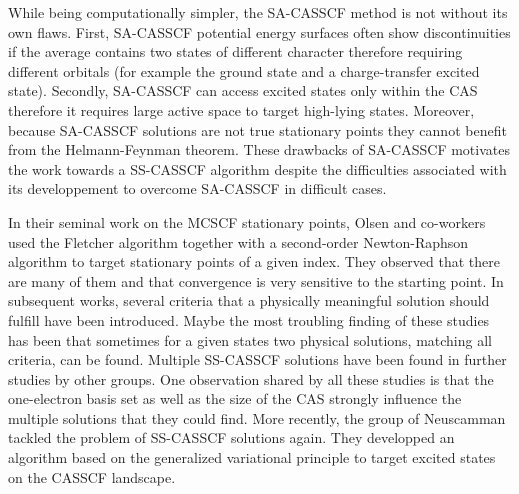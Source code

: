 \documentclass[aip,jcp,reprint,noshowkeys,superscriptaddress]{revtex4-1}
\begin{document}
While being computationally simpler, the SA-CASSCF method is not without its own flaws. \cite{Zaitsevskii_1994,Helmich-Paris_2019}
First, SA-CASSCF potential energy surfaces often show discontinuities if the average contains two states of different character therefore requiring different orbitals (for example the ground state and a charge-transfer excited state). \cite{Zaitsevskii_1994}
Secondly, SA-CASSCF can access excited states only within the CAS therefore it requires large active space to target high-lying states.
Moreover, because SA-CASSCF solutions are not true stationary points they cannot benefit from the Helmann-Feynman theorem.
These drawbacks of SA-CASSCF motivates the work towards a SS-CASSCF algorithm despite the difficulties associated with its developpement to overcome SA-CASSCF in difficult cases.

In their seminal work on the MCSCF stationary points, Olsen and co-workers used the Fletcher algorithm together with a second-order Newton-Raphson algorithm to target stationary points of a given index. \cite{Olsen_1982,Olsen_1983}
They observed that there are many of them and that convergence is very sensitive to the starting point.
In subsequent works, several criteria that a physically meaningful solution should fulfill have been introduced. \cite{Olsen_1983,Golab_1983,Golab_1985,Rizzo_1990}
Maybe the most troubling finding of these studies has been that sometimes for a given states two physical solutions, \ie matching all criteria, can be found. \cite{Rizzo_1990}
Multiple SS-CASSCF solutions have been found in further studies by other groups. \cite{Guihery_1997,Angeli_2003}
One observation shared by all these studies is that the one-electron basis set as well as the size of the CAS strongly influence the multiple solutions that they could find.
More recently, the group of Neuscamman tackled the problem of SS-CASSCF solutions again. They developped an algorithm based on the generalized variational principle to target excited states on the CASSCF landscape. \cite{Tran_2019,Tran_2020,Hanscam_2021}
\end{document}
